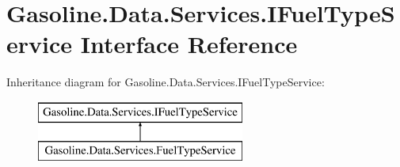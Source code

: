 \hypertarget{interface_gasoline_1_1_data_1_1_services_1_1_i_fuel_type_service}{}\section{Gasoline.\+Data.\+Services.\+I\+Fuel\+Type\+Service Interface Reference}
\label{interface_gasoline_1_1_data_1_1_services_1_1_i_fuel_type_service}
Inheritance diagram for Gasoline.\+Data.\+Services.\+I\+Fuel\+Type\+Service\+:\begin{figure}[H]
\begin{center}
\leavevmode
\includegraphics[height=2.000000cm]{interface_gasoline_1_1_data_1_1_services_1_1_i_fuel_type_service}
\end{center}
\end{figure}
